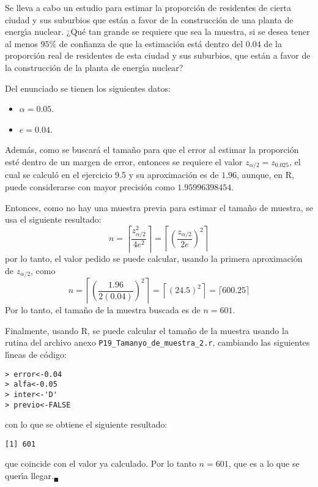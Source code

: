 \begin{enunciado}
 Se lleva a cabo un estudio para estimar la proporci\'on de residentes de cierta ciudad y sus suburbios que est\'an a favor de la construcci\'on de una planta de energ\'{\i}a nuclear. ¿Qu\'e tan grande se requiere que sea la muestra, si se desea tener al menos $95\%$ de confianza de que la estimaci\'on est\'a dentro del $0.04$ de la proporci\'on real de residentes de esta ciudad y sus suburbios, que est\'an a favor de la construcci\'on de la planta de energ\'{\i}a nuclear?
\end{enunciado}

\begin{solucion}
 Del enunciado se tienen los siguientes datos:
 \begin{itemize}
  \item $\alpha = 0.05$.
  \item $e = 0.04$.
 \end{itemize}
 Adem\'as, como se buscar\'a el tama\~no para que el error al estimar la proporci\'on est\'e dentro de un margen de error, entonces se requiere el valor $z_{\alpha/2} = z_{0.025}$, el cual se calcul\'o en el ejercicio 9.5 y su aproximaci\'on es de $1.96$, aunque, en R, puede considerarse con mayor precisi\'on como $1.95996398454$.
 \par 
 Entonces, como no hay una muestra previa para estimar el tama\~no de muestra, se usa el siguiente resultado:
 \begin{equation*}
  n = \left\lceil \frac{z_{\alpha/2}^2}{4e^2} \right\rceil = \left\lceil \left( \frac{z_{\alpha/2}}{2e} \right)^2 \right\rceil
 \end{equation*}
 por lo tanto, el valor pedido se puede calcular, usando la primera aproximaci\'on de $z_{\alpha/2}$, como
 \begin{equation*}
  n = \left\lceil \left( \frac{1.96}{2(0.04)} \right)^2 \right\rceil = \left\lceil ( 24.5 )^2 \right\rceil = \lceil 600.25 \rceil
 \end{equation*}
 Por lo tanto, el tama\~no de la muestra buscada es de $n=601$.
 \par 
 Finalmente, usando R, se puede calcular el tama\~no de la muestra usando la rutina del archivo anexo \texttt{P19\_Tamanyo\_de\_muestra\_2.r}, cambiando las siguientes l\'{\i}neas de c\'odigo:
 \begin{verbatim}
> error<-0.04
> alfa<-0.05
> inter<-'D'
> previo<-FALSE
 \end{verbatim}
 \vspace{-0.5cm}
 con lo que se obtiene el siguiente resultado:
 \begin{verbatim}
[1] 601
 \end{verbatim}
 \vspace{-0.5cm}
 que coincide con el valor ya calculado. Por lo tanto $n = 601$, que es a lo que se quer\'{\i}a llegar.${}_{\blacksquare}$
\end{solucion}

